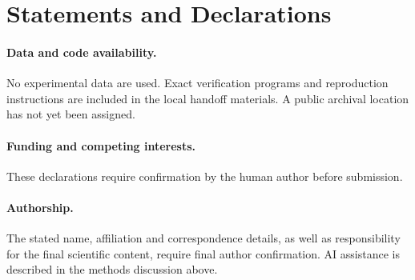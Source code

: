 \documentclass[11pt,a4paper]{article}
\begin{document}
\section*{Statements and Declarations}
\paragraph{Data and code availability.}
No experimental data are used. Exact verification programs
and reproduction instructions are included in the local
handoff materials. A public archival location has not yet
been assigned.
\paragraph{Funding and competing interests.}
These declarations require confirmation by the human author
before submission.
\paragraph{Authorship.}
The stated name, affiliation and correspondence details,
as well as responsibility for the final scientific content,
require final author confirmation. AI assistance is described
in the methods discussion above.



\end{document}
